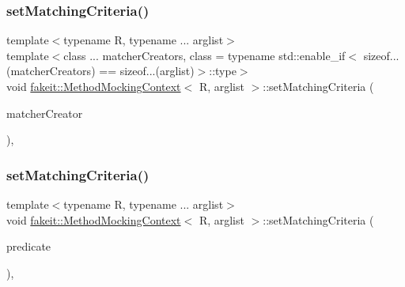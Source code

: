 \mbox{\label{classfakeit_1_1MethodMockingContext_ab6bf85e9f9f5e5eeb2766ec487a42e20}} 
\subsubsection{\texorpdfstring{setMatchingCriteria()}{setMatchingCriteria()}\hspace{0.1cm}{\footnotesize\ttfamily [3/27]}}
{\footnotesize\ttfamily template$<$typename R, typename ... arglist$>$ \\
template$<$class ... matcher\+Creators, class  = typename std\+::enable\+\_\+if$<$                sizeof...(matcher\+Creators) == sizeof...(arglist)$>$\+::type$>$ \\
void \mbox{\hyperlink{classfakeit_1_1MethodMockingContext}{fakeit\+::\+Method\+Mocking\+Context}}$<$ R, arglist $>$\+::set\+Matching\+Criteria (\begin{DoxyParamCaption}\item[{const matcher\+Creators \&...}]{matcher\+Creator }\end{DoxyParamCaption})\hspace{0.3cm}{\ttfamily [inline]}, {\ttfamily [protected]}}

\mbox{\label{classfakeit_1_1MethodMockingContext_a43555a14b32453588eb3990a7c6b9a09}} 
\subsubsection{\texorpdfstring{setMatchingCriteria()}{setMatchingCriteria()}\hspace{0.1cm}{\footnotesize\ttfamily [4/27]}}
{\footnotesize\ttfamily template$<$typename R, typename ... arglist$>$ \\
void \mbox{\hyperlink{classfakeit_1_1MethodMockingContext}{fakeit\+::\+Method\+Mocking\+Context}}$<$ R, arglist $>$\+::set\+Matching\+Criteria (\begin{DoxyParamCaption}\item[{std\+::function$<$ bool(arglist \&...)$>$}]{predicate }\end{DoxyParamCaption})\hspace{0.3cm}{\ttfamily [inline]}, {\ttfamily [protected]}}

